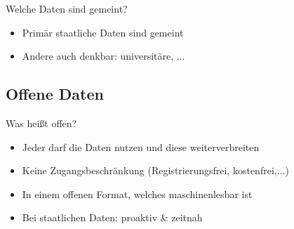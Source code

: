 \begin{frame}[t]{Welche Daten sind gemeint?}
 \begin{block}{}
 \begin{itemize}
  \item Primär staatliche Daten sind gemeint
  \item Andere auch denkbar: universitäre, $\dots$ 
 \end{itemize}
 \end{block}
\end{frame}



\subsection{Offene Daten}
\begin{frame}{Was heißt offen?}
 \begin{itemize}
  \item Jeder darf die Daten nutzen und diese weiterverbreiten
  \item Keine Zugangsbeschränkung (Registrierungsfrei, kostenfrei,$\dots$)
  \item In einem offenen Format, welches maschinenlesbar ist
  \item Bei staatlichen Daten: proaktiv \& zeitnah
 \end{itemize}
 

\end{frame}
